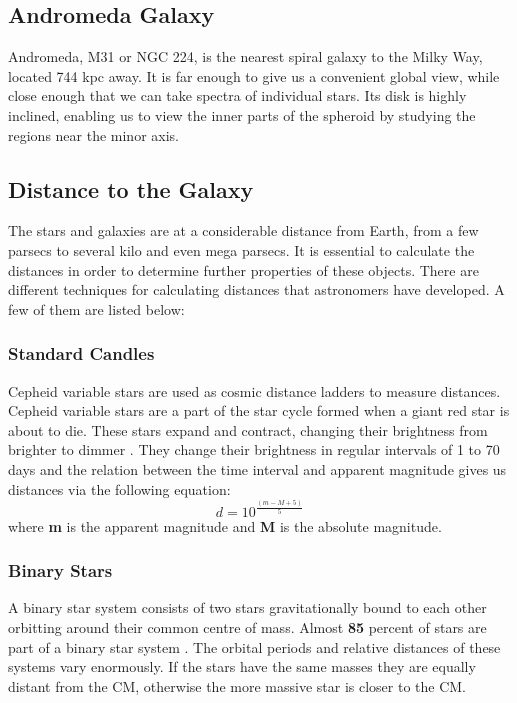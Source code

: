 \subsection{Andromeda Galaxy}
  Andromeda, M31 or NGC 224, is the nearest spiral galaxy to the Milky Way, located 744 kpc away. It is far enough to give us a convenient global view, while close enough that we can take spectra of individual stars. Its disk is highly inclined, enabling us to view the inner parts of the spheroid by studying the regions near the minor axis. 

\subsection{Distance to the Galaxy}

The stars and galaxies are at a considerable distance from Earth, from a few parsecs to several kilo and even mega parsecs. It is essential to calculate the distances in order to determine further properties of these objects. There are different techniques for calculating distances that astronomers have developed.
A few of them are listed below:

\subsubsection*{Standard Candles}
 Cepheid variable stars are used as cosmic distance ladders to measure distances. Cepheid variable stars are a part of the star cycle formed when a giant red star is about to die. These stars expand and contract, changing their brightness from brighter to dimmer \cite{stanc}.  They change their brightness in regular intervals of 1 to 70 days and the relation between the time interval and apparent magnitude gives us distances via the following equation:
 \begin{equation}
 d= 10^{\displaystyle \frac{(m-M+5)}{5}}
 \end{equation}
where \textbf{m} is the apparent magnitude and \textbf{M} is the absolute magnitude.

\subsubsection*{Binary Stars }

A binary star system consists of two stars  gravitationally bound to each other orbitting around their common centre of mass. Almost \textbf{85} percent of stars are part of a binary star system \cite{bin}. The orbital periods and relative distances of these systems vary enormously. If the stars have the same masses they are equally distant from the CM, otherwise the more massive star is closer to the CM.

